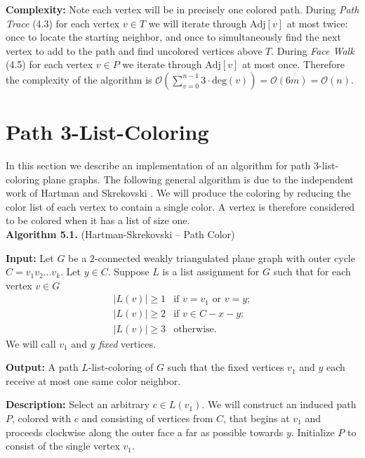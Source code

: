 \documentclass[letterpaper, 12pt]{amsart}
\theoremstyle{definition}
\theoremstyle{definition}
\theoremstyle{thm}
\theoremstyle{definition}
\begin{document}
\noindent\textbf{Complexity:} Note each vertex will be in precisely one colored
path. During \textit{Path Trace} (4.3) for each vertex $v\in T$ we will iterate through
$\text{Adj}[v]$ at most twice: once to locate the starting neighbor, and once
to simultaneously find the next vertex to add to the path and find uncolored
vertices above $T$. During \textit{Face Walk} (4.5) for each vertex
$v\in P$ we iterate through $\text{Adj}[v]$ at most once. Therefore the complexity of the algorithm is
$\mathcal{O}\left(\sum_{v=0}^{n-1}3\cdot\text{deg}(v)\right)=\mathcal{O}(6m)=\mathcal{O}(n)$.



\section{Path 3-List-Coloring}

In this section we describe an implementation of an algorithm for path
$3$-list-coloring plane graphs. The following general algorithm is due to the
independent work of Hartman \cite{hartman} and Skrekovski \cite{skrekovski}.
We will produce the coloring by reducing the color list of each vertex to
contain a single color. A vertex is therefore considered to be colored when it
has a list of size one.\\

\noindent\textbf{Algorithm 5.1.} (Hartman-Skrekovski -- Path Color)

\noindent\textbf{Input:} Let $G$ be a $2$-connected weakly triangulated plane
graph with outer cycle $C=v_1v_2\ldots v_k$. Let $y\in C$.
Suppose $L$ is a list assignment for $G$ such that
for each vertex $v\in G$
\[
    \begin{array}{ll}
	    |L(v)|\ge 1 & \text{if } v=v_1 \text{ or } v=y;\\
	    |L(v)|\ge 2 & \text{if } v\in C-x-y;\\
	    |L(v)|\ge 3 & \text{otherwise.}
    \end{array}
\]
We will call $v_1$ and $y$ \textit{fixed} vertices.

\noindent\textbf{Output:} A path $L$-list-coloring of $G$ such that the fixed
vertices $v_1$ and $y$ each receive at most one same color neighbor.

\noindent\textbf{Description:} Select an arbitrary $c\in L(v_1)$. We will construct an induced
path $P$, colored with $c$ and consisting of vertices from $C$, that begins at $v_1$ and proceeds
clockwise along the outer face a far as possible towards $y$. Initialize $P$ to consist of
the single vertex $v_1$.
\end{document}
